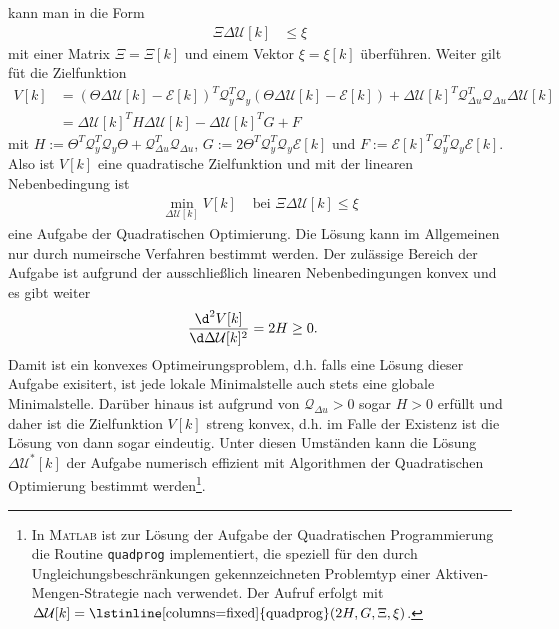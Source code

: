 kann man  in die Form
\begin{align}
	\Xi\Delta\mathcal{U}[k] & \le \xi\label{eqn:kap_4_lin_nebenbedinung_form}
\end{align}
mit einer Matrix $\Xi=\Xi[k]$ und einem Vektor $\xi = \xi[k]$ überführen. Weiter gilt füt die Zielfunktion
\begin{align*}
	V[k] & = \left( \Theta\Delta\mathcal{U}[k]-\mathcal{E}[k] \right)^T\mathcal{Q}_y^T\mathcal{Q}_y\left( \Theta\Delta\mathcal{U}[k]-\mathcal{E}[k]
	\right)+\Delta\mathcal{U}[k]^T\mathcal{Q}^T_{\Delta u}\mathcal{Q}_{\Delta u}\Delta\mathcal{U}[k]\\
	& = \Delta\mathcal{U}[k]^T H \Delta\mathcal{U}[k]-\Delta\mathcal{U}[k]^TG+F
\end{align*}
mit $H:=\Theta^T\mathcal{Q}_y^T\mathcal{Q}_y\Theta+\mathcal{Q}^T_{\Delta u}\mathcal{Q}_{\Delta u}$,
$G:=2\Theta^T\mathcal{Q}_y^T\mathcal{Q}_y\mathcal{E}[k]$ und $F:=\mathcal{E}[k]^T\mathcal{Q}_y^T\mathcal{Q}_y\mathcal{E}[k]$. Also ist $V[k]$ eine quadratische Zielfunktion und mit der linearen Nebenbedingung
 ist
\begin{align}
	\min\limits_{\Delta\mathcal{U}[k]}V[k] & \text{ bei } \Xi\Delta\mathcal{U}[k]\le \xi\label{eqn:kap_4_quad_opt_aufgabe_lin_nebenbedingungen}
\end{align}
eine Aufgabe der Quadratischen Optimierung. Die Lösung kann im Allgemeinen nur durch numeirsche Verfahren bestimmt werden. Der zulässige Bereich der Aufgabe ist aufgrund der
ausschließlich linearen Nebenbedingungen konvex und es gibt weiter
\begin{align*}
\frac{\d^2 V[k]}{\d\Delta\mathcal{U}[k]^2} & = 2 H \ge 0.
\end{align*}
Damit ist  ein konvexes Optimeirungsproblem, d.h. falls eine Lösung dieser Aufgabe exisitert, ist jede lokale Minimalstelle auch
stets eine globale Minimalstelle. Darüber hinaus ist aufgrund von $\mathcal{Q}_{\Delta u}>0$ sogar $H>0$ erfüllt und daher ist die Zielfunktion $V[k]$
streng konvex, d.h. im Falle der Existenz ist die Lösung von  dann sogar eindeutig. Unter diesen Umständen kann die Lösung $\Delta\mathcal{U}^{\ast}[k]$
der Aufgabe  numerisch effizient mit Algorithmen der Quadratischen Optimierung bestimmt werden\footnote{In \textsc{Matlab} ist zur Lösung
der Aufgabe der Quadratischen Programmierung die Routine \lstinline[columns=fixed]{quadprog} implementiert, die speziell für den durch Ungleichungsbeschränkungen gekennzeichneten
Problemtyp  einer Aktiven-Mengen-Strategie nach \cite{Gill1981} verwendet. Der Aufruf erfolgt mit
$\Delta\mathcal{U}[k]=\text{\lstinline[columns=fixed]{quadprog}}(2H,G,\Xi,\xi)$.}.

